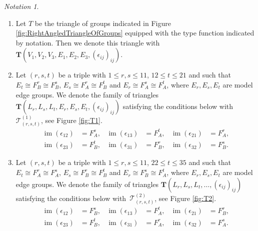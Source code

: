 \documentclass[dvipsnames]{article}
\theoremstyle{definition}
\theoremstyle{remark}
\newtheorem{notation}[theorem]{Notation}
\DeclareMathOperator{\im}{im}
\begin{document}
    \begin{notation}
        \begin{enumerate}
            \item 
            Let $T$ be the triangle of groups indicated in Figure \ref{fig:RightAngledTriangleOfGroups} equipped with the type function indicated by notation. Then we denote this triangle with $\textbf{T} (V_1,\allowbreak V_2,\allowbreak V_3,\allowbreak E_1,\allowbreak E_2,\allowbreak E_3,\allowbreak (\epsilon_{ij})_{ij})$. 
            \item
            Let $(r,s,t)$ be a triple with $1\leq r,s \leq 11$, $12 \leq t \leq 21$ and such that
            $E_t \cong F^r_B \cong F^s_B$,
            $E_s \cong F^r_A \cong F^t_B$ and
            $E_r \cong F^s_A \cong F^t_A$, where $E_r,E_s, E_t$ are model edge groups.
            We denote the family of triangles $\textbf{T}(L_r, L_s, L_t, E_r, E_s, E_t, (\epsilon_{ij})_{ij})$ satisfying the conditions below with~$\mathcal T_{(r,s,t)}^{(1)}$, see Figure \ref{fig:T1}.
            \begin{align*}
                \im(\epsilon_{12}) & = F^s_A, &
                \im(\epsilon_{13}) & = F^t_A, &
                \im(\epsilon_{21}) & = F^r_A, \\
                \im(\epsilon_{23}) & = F^t_B, &
                \im(\epsilon_{31}) & = F^r_B, &
                \im(\epsilon_{32}) & = F^s_B.
            \end{align*}
            \item
            Let $(r,s,t)$ be a triple with $1\leq r,s \leq 11$, $22 \leq t \leq 35$ and such that
            $E_t \cong F^r_A \cong F^s_A$,
            $E_s \cong F^r_B \cong F^t_B$ and
            $E_r \cong F^s_B \cong F^t_A$, where $E_r,E_s, E_t$ are model edge groups.
            We denote the family of triangles $\textbf{T}(L_r, L_s, L_t, \dots, (\epsilon_{ij})_{ij})$ satisfying the conditions below with~$\mathcal T_{(r,s,t)}^{(2)}$, see Figure \ref{fig:T2}.
            \begin{align*}
                \im(\epsilon_{12}) & = F^s_B, &
                \im(\epsilon_{13}) & = F^t_A, &
                \im(\epsilon_{21}) & = F^r_B, \\
                \im(\epsilon_{23}) & = F^t_B, &
                \im(\epsilon_{31}) & = F^r_A, &
                \im(\epsilon_{32}) & = F^s_A.
            \end{align*}
        \end{enumerate}
    \end{notation}
    
\end{document}
